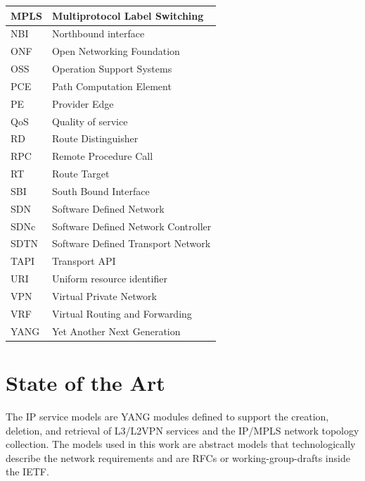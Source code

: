 \documentclass[10pt, conference]{IEEEtran}
\begin{document}
\begin{table}[htb!]
\begin{tabular}{|l|l|}
MPLS         & Multiprotocol Label Switching                \\ \hline
NBI          & Northbound interface                         \\ \hline
ONF          & Open Networking Foundation                   \\ \hline
OSS          & Operation Support Systems                    \\ \hline
PCE          & Path Computation Element                     \\ \hline
PE           & Provider Edge                                \\ \hline
QoS          & Quality of service                           \\ \hline
RD           & Route Distinguisher                          \\ \hline
RPC          & Remote Procedure Call                        \\ \hline
RT           & Route Target                                 \\ \hline
SBI          & South Bound Interface                        \\ \hline
SDN          & Software Defined Network                     \\ \hline
SDNc         & Software Defined Network Controller          \\ \hline
SDTN         & Software Defined Transport Network           \\ \hline
TAPI         & Transport API                                \\ \hline
URI          & Uniform resource identifier                  \\ \hline
VPN          & Virtual Private Network                      \\ \hline
VRF          & Virtual Routing and Forwarding               \\ \hline
YANG         & Yet Another Next Generation                   \\ \hline
\end{tabular}
\end{table}

\section{State of the Art}
\label{sec:soa}

The IP service models are YANG modules defined to support the creation, deletion, and retrieval of L3/L2VPN services and the IP/MPLS network topology collection. The models used in this work are abstract models that technologically describe the network requirements and are RFCs or working-group-drafts inside the IETF.
\end{document}
